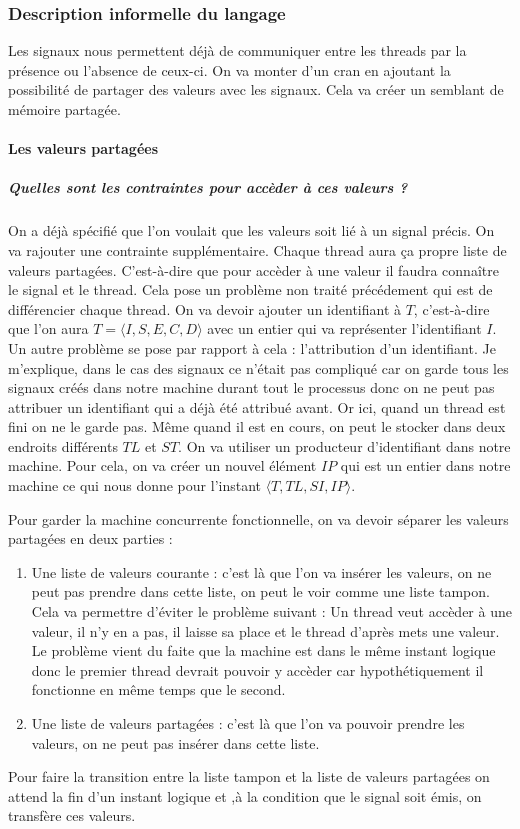\documentclass[10pt,a4paper]{article}
\begin{document}
			\subsubsection{Description informelle du langage}
				Les signaux nous permettent déjà de communiquer entre les threads par la présence ou l'absence de ceux-ci. On va monter d'un cran en ajoutant la possibilité de partager des valeurs avec les signaux. Cela va créer un semblant de mémoire partagée.
				\medbreak
				
				\paragraph{Les valeurs partagées}
				
					\subparagraph{Quelles sont les contraintes pour accèder à ces valeurs ?}
					On a déjà spécifié que l'on voulait que les valeurs soit lié à un signal précis. On va rajouter une contrainte supplémentaire. Chaque thread aura ça propre liste de valeurs partagées. C'est-à-dire que pour accèder à une valeur il faudra connaître le signal et le thread. Cela pose un problème non traité précédement qui est de différencier chaque thread. On va devoir ajouter un identifiant à $T$, c'est-à-dire que l'on aura $T = \langle I,S,E,C,D\rangle$ avec un entier qui va représenter l'identifiant $I$. Un autre problème se pose par rapport à cela : l'attribution d'un identifiant.
					\smallbreak
					Je m'explique, dans le cas des signaux ce n'était pas compliqué car on garde tous les signaux créés dans notre machine durant tout le processus donc on ne peut pas attribuer un identifiant qui a déjà été attribué avant. Or ici, quand un thread est fini on ne le garde pas. Même quand il est en cours, on peut le stocker dans deux endroits différents $TL$ et $ST$. On va utiliser un producteur d'identifiant dans notre machine. Pour cela, on va créer un nouvel élément $IP$ qui est un entier dans notre machine ce qui nous donne pour l'instant $\langle T,TL,SI,IP\rangle$.
					\medbreak
					
					Pour garder la machine concurrente fonctionnelle, on va devoir séparer les valeurs partagées en deux parties :
					\begin{enumerate}
						\item Une liste de valeurs courante : c'est là que l'on va insérer les valeurs, on ne peut pas prendre dans cette liste, on peut le voir comme une liste tampon. Cela va permettre d'éviter le problème suivant : 
						\smallbreak
						Un thread veut accèder à une valeur, il n'y en a pas, il laisse sa place et le thread d'après mets une valeur. Le problème vient du faite que la machine est dans le même instant logique donc le premier thread devrait pouvoir y accèder car hypothétiquement il fonctionne en même temps que le second.
						\item Une liste de valeurs partagées : c'est là que l'on va pouvoir prendre les valeurs, on ne peut pas insérer dans cette liste.
					\end{enumerate}
					\smallbreak
					Pour faire la transition entre la liste tampon et la liste de valeurs partagées on attend la fin d'un instant logique et ,à la condition que le signal soit émis, on transfère ces valeurs.
					\medbreak
					
\end{document}

